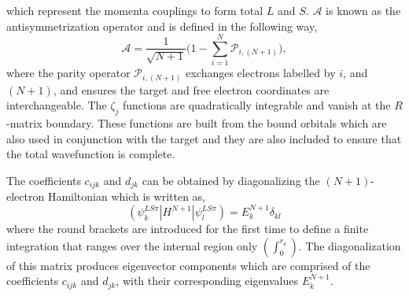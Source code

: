 which represent the momenta couplings to form total $L$ and $S$. $\mathcal{A}$ is known as the antisymmetrization operator and is defined in the following way,
\[
\mathcal{A}=\frac{1}{\sqrt{N+1}}\Big(1 - \sum_{i=1}^{N}\mathcal{P}_{i,(N+1)}\Big),
\]
where the parity operator $\mathcal{P}_{i,(N+1)}$ exchanges electrons labelled by $i$, and $(N+1)$, and ensures the target and free electron coordinates are interchangeable. The $\zeta_j$ functions are quadratically integrable and vanish at the $R$-matrix boundary. These functions are built from the bound orbitals which are also used in conjunction with the target and they are also included to ensure that the total wavefunction is complete.

The coefficients $c_{ijk}$ and $d_{jk}$ can be obtained by diagonalizing the $(N+1)$-electron Hamiltonian which is written as,
\begin{equation}\label{eq:rmat_n+1diag}
(\psi^{LS\pi}_k|H^{N+1}|\psi^{LS\pi}_l)=E_k^{N+1}\delta_{kl}
\end{equation}
where the round brackets are introduced for the first time to define a finite integration that ranges over the internal region only $(\int^{r_a}_0)$. The diagonalization of this matrix produces eigenvector components which are comprised of the coefficients $c_{ijk}$ and $d_{jk}$, with their corresponding eigenvalues $E_k^{N+1}$.

